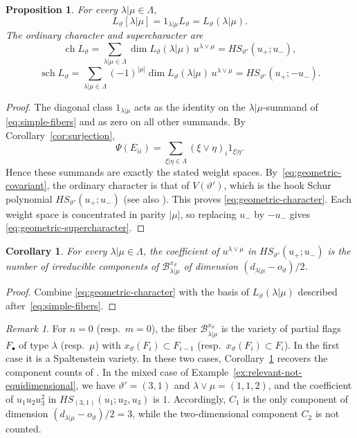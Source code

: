 \documentclass[11pt,a4paper]{amsart}
\newtheorem{proposition}[theorem]{Proposition}
\newtheorem{corollary}[theorem]{Corollary}
\theoremstyle{definition}
\theoremstyle{remark}
\newtheorem{remark}[theorem]{Remark}
\newcommand{\lm}{\lambda|\mu}
\newcommand{\xh}{\xi|\eta}
\numberwithin{equation}{section}
\begin{document}
\begin{proposition}\label{prop:characters}
For every $\lm\in\Lambda$,
\begin{equation}\label{eq:geometric-weight-spaces}
L_\vartheta[\lm]
=1_{\lm}L_\vartheta
=L_\vartheta(\lm).
\end{equation}
The ordinary character and supercharacter are
\begin{equation}\label{eq:geometric-character}
\operatorname{ch}L_\vartheta
=\sum_{\lm\in\Lambda}\dim L_\vartheta(\lm)\,u^{\lambda\vee\mu}
=HS_{\vartheta'}(u_+;u_-),
\end{equation}
\begin{equation}\label{eq:geometric-supercharacter}
\operatorname{sch}L_\vartheta
=\sum_{\lm\in\Lambda}(-1)^{|\mu|}\dim L_\vartheta(\lm)\,u^{\lambda\vee\mu}
=HS_{\vartheta'}(u_+;-u_-).
\end{equation}
\end{proposition}
\begin{proof}
The diagonal class $1_{\lm}$ acts as the identity on the
$\lm$-summand of \eqref{eq:simple-fibers} and as zero on all other
summands. By Corollary~\ref{cor:surjection},
$$
\Psi(E_{ii})=\sum_{\xh\in\Lambda}(\xi\vee\eta)_i1_{\xh}.
$$
Hence these summands are exactly the stated weight spaces.
By~\eqref{eq:geometric-covariant}, the ordinary character is that of
$V(\vartheta')$, which is the hook Schur polynomial
$HS_{\vartheta'}(u_+;u_-)$ \cite{BR} (see also
\cite[Corollary~4.20]{Molev}). This proves
\eqref{eq:geometric-character}. Each weight space is concentrated in
parity $|\mu|$, so replacing $u_-$ by $-u_-$ gives
\eqref{eq:geometric-supercharacter}.
\end{proof}

\begin{corollary}\label{cor:component-count}
For every $\lm\in\Lambda$, the coefficient of $u^{\lambda\vee\mu}$ in
$HS_{\vartheta'}(u_+;u_-)$ is the number of irreducible components of
$\mathcal B_{\lm}^{x_\vartheta}$ of dimension $(d_{\lm}-o_\vartheta)/2$.
\end{corollary}
\begin{proof}
Combine \eqref{eq:geometric-character} with the basis of
$L_\vartheta(\lm)$ described after~\eqref{eq:simple-fibers}.
\end{proof}

\begin{remark}\label{rem:classical-counts}
For $n=0$ (resp.\ $m=0$), the fiber $\mathcal B_{\lm}^{x_\vartheta}$ is
the variety of partial flags $F_\bullet$ of type $\lambda$ (resp.\ $\mu$)
with $x_\vartheta(F_i)\subset F_{i-1}$ (resp.\ $x_\vartheta(F_i)\subset F_i$).
In the first case it is a Spaltenstein variety. In these two cases,
Corollary~\ref{cor:component-count} recovers the component counts of
\cite[Section~3.5]{BM}. In the mixed case of
Example~\ref{ex:relevant-not-equidimensional}, we have
$\vartheta'=(3,1)$ and $\lambda\vee\mu=(1,1,2)$, and the coefficient of
$u_1u_2u_3^2$ in $HS_{(3,1)}(u_1;u_2,u_3)$ is $1$. Accordingly, $C_1$ is
the only component of dimension $(d_{\lm}-o_\vartheta)/2=3$, while the
two-dimensional component $C_2$ is not counted.
\end{remark}
\end{document}
